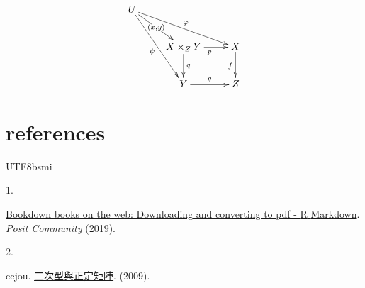 \documentclass[
]{book}
\newlength{\cslhangindent}
\newlength{\csllabelwidth}
\newlength{\cslentryspacingunit} %
\newenvironment{CSLReferences}[2] %
 {%
  \setlength{\parindent}{0pt}
  \ifodd #1
  \let\oldpar\par
  \def\par{\hangindent=\cslhangindent\oldpar}
  \fi
  \setlength{\parskip}{#2\cslentryspacingunit}
 }%
 {}
\newcommand{\CSLLeftMargin}[1]{\parbox[t]{\csllabelwidth}{#1}}
\newcommand{\CSLRightInline}[1]{\parbox[t]{\linewidth - \csllabelwidth}{#1}\break}
\theoremstyle{definition}
\theoremstyle{definition}
\theoremstyle{definition}
\theoremstyle{definition}
\theoremstyle{remark}
\begin{document}
\[
\xymatrix{U\ar[ddr]_{\psi}\ar[drr]^{\varphi}\ar[dr]|-{(x,y)}\\
 & X\times_{Z}Y\ar[d]^{q}\ar[r]_{p} & X\ar[d]_{f}\\
 & Y\ar[r]^{g} & Z
}
\]

\hypertarget{references}{%
\chapter*{references}\label{references}}
\begin{CJK}{UTF8}{bsmi}
\hypertarget{refs}{}
\begin{CSLReferences}{0}{0}
\leavevmode{}%
\CSLLeftMargin{1. }%
\CSLRightInline{\href{https://community.rstudio.com/t/bookdown-books-on-the-web-downloading-and-converting-to-pdf/30268}{Bookdown books on the web: Downloading and converting to pdf - {R} {Markdown}}. \emph{Posit Community} (2019).}

\leavevmode{}%
\CSLLeftMargin{2. }%
\CSLRightInline{ccjou. \href{https://ccjou.wordpress.com/2009/10/21/\%e4\%ba\%8c\%e6\%ac\%a1\%e5\%9e\%8b\%e8\%88\%87\%e6\%ad\%a3\%e5\%ae\%9a\%e7\%9f\%a9\%e9\%99\%a3/}{二次型與正定矩陣}. (2009).}

\end{CSLReferences}
\end{CJK}
\end{document}
